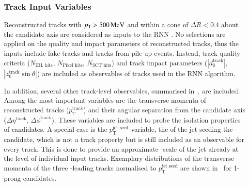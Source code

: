 \subsubsection{Track Input Variables}

Reconstructed tracks with $p_{\text{T}} > \SI{500}{\ensuremath{\text{MeV}}}$ and within a cone of
$\Delta R < 0.4$ about the \tauhadvis candidate axis are considered as
inputs to the RNN \tauid. No selections are applied on the quality and
impact parameters of reconstructed tracks, thus the inputs include
fake tracks and tracks from pile-up events. Instead, track quality
criteria ($N_{\text{IBL hits}}$, $N_{\text{Pixel hits}}$,
$N_{\text{SCT hits}}$) and track impact parameters
($|d_0^{\text{track}}|$, $|z_0^{\text{track}} \sin\theta|$) are
included as observables of tracks used in the RNN \tauid algorithm.

In addition, several other track-level observables, summarised
in~, are included. Among the most
important variables are the transverse momenta of reconstructed tracks
($p_{\text{T}}^{\text{track}}$) and their angular separation from the \tauhadvis
candidate axis ($\Delta \eta^{\text{track}}$, $\Delta
\phi^{\text{track}}$). These variables are included to probe the isolation
properties of \tauhadvis candidates. A special case is the
$p_{\text{T}}^{\text{jet seed}}$ variable, the \pT of the jet seeding the
\tauhadvis candidate, which is not a track property but is still included as an
observable for every track. This is done to provide an approximate \pT-scale of
the jet already at the level of individual input tracks. Exemplary distributions
of the transverse momenta of the three \pT-leading tracks normalised to
$p_{\text{T}}^{\text{jet seed}}$ are shown
in~ for 1-prong \tauhadvis
candidates.


